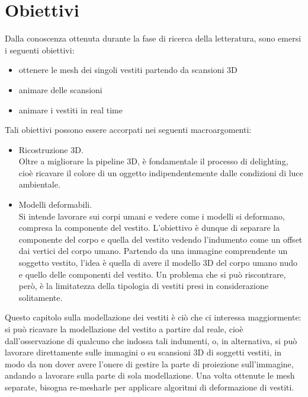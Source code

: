 \section{Obiettivi}

Dalla conoscenza ottenuta durante la fase di ricerca della letteratura, sono emersi i seguenti obiettivi:

\begin{itemize}
\item ottenere le mesh dei singoli vestiti partendo da scansioni 3D
\item animare delle scansioni
\item animare i vestiti in real time
\end{itemize}

\medskip
Tali obiettivi possono essere accorpati nei seguenti macroargomenti:

\medskip

\begin{itemize}
\item Ricostruzione 3D. \\ Oltre a migliorare la pipeline 3D, è fondamentale il processo di delighting, cioè ricavare il colore di un oggetto indipendentemente dalle condizioni di luce ambientale.
\item Modelli deformabili. \\ Si intende lavorare sui corpi umani e vedere come i modelli si deformano, compresa la componente del vestito. L’obiettivo è dunque di separare la componente del corpo e quella del vestito vedendo l’indumento come un offset dai vertici del corpo umano. Partendo da una immagine comprendente un soggetto vestito, l’idea è quella di avere il modello 3D del corpo umano nudo e quello delle componenti del vestito. Un problema che si può riscontrare, però, è la limitatezza della tipologia di vestiti presi in considerazione solitamente.


\end{itemize}

\medskip

Questo capitolo sulla modellazione dei vestiti è ciò che ci interessa maggiormente: si può ricavare la modellazione del vestito a partire dal reale, cioè dall’osservazione di qualcuno che indossa tali indumenti, o, in alternativa, si può lavorare direttamente sulle immagini o su scansioni 3D di soggetti vestiti, in modo da non dover avere l’onere di gestire la parte di proiezione sull’immagine, andando a lavorare sulla parte di sola modellazione.
Una volta ottenute le mesh separate, bisogna re-mesharle per applicare algoritmi di deformazione di vestiti.

